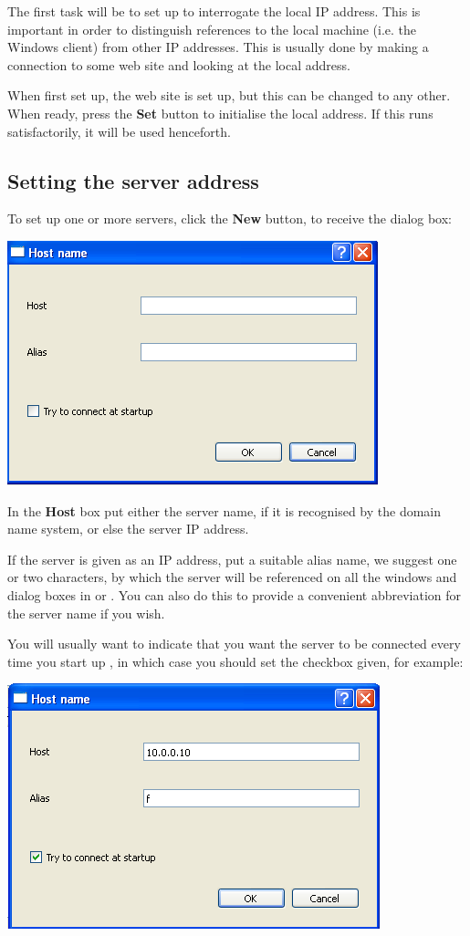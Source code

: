 The first task will be to set up to interrogate the local IP address. This is important in order to distinguish references to the local machine
(i.e. the Windows client) from other IP addresses. This is usually done by making a connection to some web site and looking at the
local address.

When first set up, the web site  is set up, but this can be changed to any other. When ready, press the \textbf{Set}
button to initialise the local address. If this runs satisfactorily, it will be used henceforth.

\subsection{Setting the server address}
\label{bkm:installservs}

To set up one or more servers, click the \textbf{New} button, to receive the dialog box:

\includegraphics{img/btqwnewhost.png}

In the \textbf{Host} box put either the server name, if it is recognised by the domain name system, or else the server IP address.

If the server is given as an IP address, put a suitable alias name, we suggest one or two characters, by which the server will be referenced
on all the windows and dialog boxes in  or . You can also do this to provide a convenient abbreviation for the
server name if you wish.

You will usually want to indicate that you want the server to be connected every time you start up , in which case you should
set the checkbox given, for example:

\includegraphics{img/btqwnewhostset.png}


